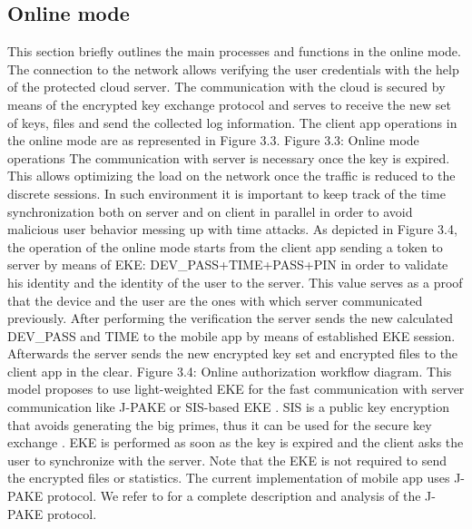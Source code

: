 \documentclass[twocolumn]{svjour3}          %
\begin{document}
\subsection{Online mode}
\label{sec_online_mode}
This section briefly outlines the main processes and functions in the online mode. The connection to the network allows verifying the user credentials with the help of the protected cloud server. The communication with the cloud is secured by means of the encrypted key exchange protocol \cite{hao2010j, hao2008password} and serves to receive the new set of keys, files and send the collected log information. The client app operations in the online mode are as represented in Figure 3.3.
Figure 3.3: Online mode operations
The communication with server is necessary once the key is expired. This allows optimizing the load on the network once the traffic is reduced to the discrete sessions. In such environment it is important to keep track of the time synchronization both on server and on client in parallel in order to avoid malicious user behavior messing up with time attacks.
As depicted in Figure 3.4, the operation of the online mode starts from the client app sending a token to server by means of EKE: DEV\_PASS+TIME+PASS+PIN in order to validate his identity and the identity of the user to the server. This value serves as a proof that the device and the user are the ones with which server communicated previously. After performing the verification the server sends the new calculated DEV\_PASS and TIME to the mobile app by means of established EKE session. Afterwards the server sends the new encrypted key set and encrypted files to the client app in the clear.
Figure 3.4: Online authorization workflow diagram.
This model proposes to use light-weighted EKE for the fast communication with server communication like J-PAKE \cite{hao2010j, hao2008password} or SIS-based EKE \cite{bogos2013primeless}. SIS is a public key encryption that avoids generating the big primes, thus it can be used for the secure key exchange \cite{bogos2013primeless,bellovin1992encrypted}. EKE is performed as soon as the key is expired and the client asks the user to synchronize with the server. Note that the EKE is not required to send the encrypted files or statistics. The current implementation of mobile app uses J-PAKE protocol. We refer to \cite{hao2010j, hao2008password, toorani2014security} for a complete description and analysis of the J-PAKE protocol.
\end{document}
